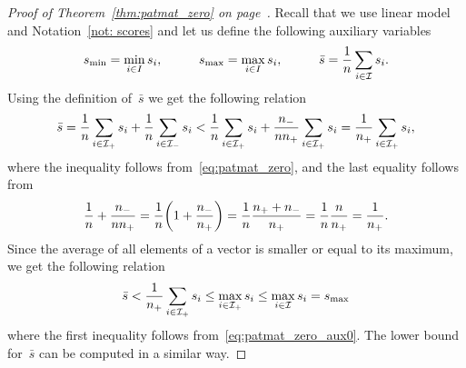 \patmatzero*
\begin{proof}[Proof of Theorem~\ref{thm:patmat_zero} on page~\pageref{thm:patmat_zero}]
  Recall that we use linear model and Notation~\ref{not: scores} and let us define the following auxiliary variables
  \begin{equation*}
    \begin{aligned}
      s_{\min} & = \min_{i \in I} s_i, \qquad & 
      s_{\max} & = \max_{i \in I} s_i, \qquad &
      \bar{s} & = \frac{1}{n} \sum_{i \in \mathcal{I}} s_i. \\
    \end{aligned}
  \end{equation*}
  Using the definition of~$\bar{s}$ we get the following relation
  \begin{equation}\label{eq:patmat_zero_aux0}
    \bar{s}
      = \frac{1}{n}\sum_{i \in \mathcal{I}_{+}} s_i + \frac{1}{n} \sum_{i \in \mathcal{I}_{-}} s_i
      < \frac{1}{n} \sum_{i \in \mathcal{I}_{+}} s_i + \frac{n_{-}}{nn_{+}} \sum_{i \in \mathcal{I}_{+}} s_i
      = \frac{1}{n_{+}} \sum_{i \in \mathcal{I}_{+}} s_i,
  \end{equation}
  where the inequality follows from~\eqref{eq:patmat_zero}, and the last equality follows from
  \begin{equation*}
    \frac{1}{\nall} + \frac{\nneg}{n\npos}
      = \frac{1}{\nall} \Brac{1 + \frac{\nneg}{\npos}} 
      = \frac{1}{\nall} \frac{\npos + \nneg}{\npos}
      = \frac{1}{\nall} \frac{n}{\npos}
      = \frac{1}{\npos}.
  \end{equation*}
  Since the average of all elements of a vector is smaller or equal to its maximum, we get the following relation
  \begin{equation*}
    \bar{s}
      < \frac{1}{n_{+}} \sum_{i \in \mathcal{I}_{+}} s_i
      \leq \max_{i \in \mathcal{I}_{+}} s_i
      \leq \max_{i \in \mathcal{I}} s_i
      = s_{\max}
  \end{equation*}
  where the first inequality follows from~\eqref{eq:patmat_zero_aux0}. The lower bound for~$\bar{s}$ can be computed in a similar way.
  

\end{proof}
